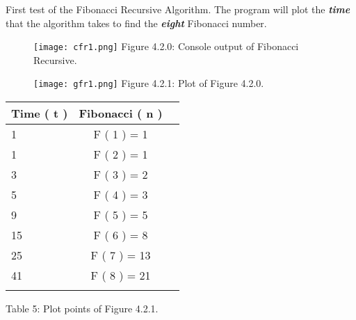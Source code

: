 \documentclass[10pt,a4paper]{article}
\begin{document}
First test of the Fibonacci Recursive Algorithm. The program will plot the {\bfseries\itshape time} that the algorithm takes to find the {\bfseries\itshape eight} Fibonacci number.

\begin{figure}[H]
\texttt{[image: cfr1.png]}
\centering \linebreak \linebreak Figure 4.2.0: Console output of Fibonacci Recursive.
\end{figure}

\begin{multicols}{2}
\begin{figure}[H]
\texttt{[image: gfr1.png]}
\centering \linebreak \linebreak Figure 4.2.1: Plot of Figure 4.2.0.
\end{figure}

\begin{center}
\begin{itemize}
\end{itemize}
\begin{tabular}[.5cm]{l c c }
\toprule
Time ( t ) & Fibonacci ( n ) \\
\midrule
1 & F ( 1 ) = 1 \\
\cmidrule{1-2}
1 & F ( 2 ) = 1 \\
\cmidrule{1-2}
3 & F ( 3 ) = 2 \\
\cmidrule{1-2}
5 & F ( 4 ) = 3 \\
\cmidrule{1-2}
9 & F ( 5 ) = 5 \\
\cmidrule{1-2}
15 & F ( 6 ) = 8 \\
\cmidrule{1-2}
25 & F ( 7 ) = 13 \\
\cmidrule{1-2}
41 & F ( 8 ) = 21 \\
\bottomrule
\linebreak
\end{tabular}
\linebreak Table 5: Plot points of Figure 4.2.1.
\end{center}
\end{multicols} \hfill

{\bfseries\itshape\color{OliveGreen}{Observation:}} {\itshape{}} \hfill \break
\end{document}
